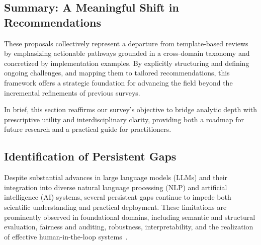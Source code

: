 \documentclass[sigconf]{acmart}
\begin{document}
\subsection{Summary: A Meaningful Shift in Recommendations}

These proposals collectively represent a departure from template-based reviews by emphasizing actionable pathways grounded in a cross-domain taxonomy and concretized by implementation examples. By explicitly structuring and defining ongoing challenges, and mapping them to tailored recommendations, this framework offers a strategic foundation for advancing the field beyond the incremental refinements of previous surveys. 

In brief, this section reaffirms our survey's objective to bridge analytic depth with prescriptive utility and interdisciplinary clarity, providing both a roadmap for future research and a practical guide for practitioners.

\subsection{Identification of Persistent Gaps}

Despite substantial advances in large language models (LLMs) and their integration into diverse natural language processing (NLP) and artificial intelligence (AI) systems, several persistent gaps continue to impede both scientific understanding and practical deployment. These limitations are prominently observed in foundational domains, including semantic and structural evaluation, fairness and auditing, robustness, interpretability, and the realization of effective human-in-the-loop systems~\cite{ref2,ref7,ref10,ref12,ref13,ref15,ref16,ref17,ref18,ref19,ref20,ref22,ref24,ref25,ref26,ref28,ref30,ref31,ref32,ref33,ref34,ref36,ref37,ref38,ref39,ref42,ref43,ref44,ref46,ref47,ref48,ref49,ref50,ref52,ref53,ref54,ref55,ref56,ref57,ref58,ref59,ref60,ref66,ref67,ref68,ref69,ref70,ref76,ref77,ref78,ref79,ref80,ref86,ref87,ref88,ref89,ref90,ref91,ref92,ref93,ref94,ref95,ref96,ref97,ref98,ref99,ref100,ref101,ref102,ref103,ref104,ref105,ref106,ref107,ref108}.
\end{document}
